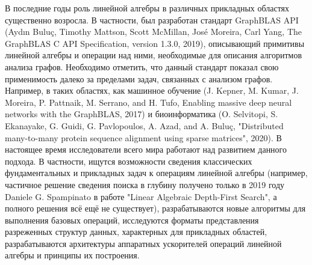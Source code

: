 \documentclass[12pt]{article}  %
\theoremstyle{remark}
\begin{document}
В последние годы роль линейной алгебры в различных прикладных областях существенно возросла. В частности, был разработан стандарт GraphBLAS API (Aydın Buluç, Timothy Mattson, Scott McMillan, Jos\'{e} Moreira, Carl Yang, The GraphBLAS C API Specification, version 1.3.0, 2019), описывающий примитивы линейной алгебры и операции над ними, необходимые для описания алгоритмов анализа графов. Необходимо отметить, что данный стандарт показал свою применимость далеко за пределами задач, связанных с анализом графов. Например, в таких областях, как машинное обучение (J. Kepner, M. Kumar, J. Moreira, P. Pattnaik, M. Serrano, and H. Tufo, Enabling massive deep neural networks with the GraphBLAS, 2017) и биоинформатика (O. Selvitopi, S. Ekanayake, G. Guidi, G. Pavlopoulos, A. Azad, and A. Bulu\c{c}, "Distributed many-to-many protein sequence alignment using sparse matrices", 2020). В настоящее время исследователи всего мира работают над развитием данного подхода. В частности, ищутся возможности сведения классических фундаментальных и прикладных задач к операциям линейной алгебры (например, частичное решение сведения поиска в глубину получено только в 2019 году Daniele G. Spampinato в работе "Linear Algebraic Depth-First Search", а полного решения всё ещё не существует), разрабатываются новые алгоритмы для выполнения базовых операций, исследуются форматы представления разреженных структур данных, характерных для прикладных областей, разрабатываются архитектуры аппаратных ускорителей операций линейной алгебры и принципы их построения.
\end{document}

